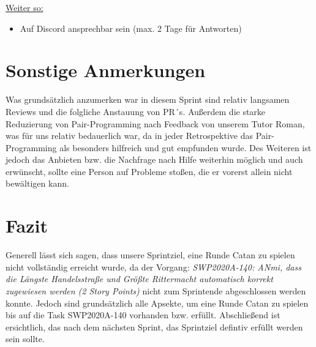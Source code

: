 \documentclass[12pt,a4paper, oneside]{article}
\begin{document}
\underline{Weiter so:}
\begin{itemize}
    \item Auf Discord ansprechbar sein (max. 2 Tage für Antworten)
\end{itemize}

\newpage
\section{Sonstige Anmerkungen}
Was grundsätzlich anzumerken war in diesem Sprint sind relativ langsamen Reviews und die folgliche Anstauung von PR´s.
Außerdem die starke Reduzierung von Pair-Programming nach Feedback von unserem Tutor Roman, was für uns relativ bedauerlich war, da in jeder Retrospektive das Pair-Programming als besonders hilfreich und gut empfunden wurde.
Des Weiteren ist jedoch das Anbieten bzw. die Nachfrage nach Hilfe weiterhin möglich und auch erwünscht, sollte eine Person auf Probleme stoßen, die er vorerst allein nicht bewältigen kann.

\section{Fazit}
Generell lässt sich sagen, dass unsere Sprintziel, eine Runde Catan zu spielen nicht vollständig erreicht wurde, da der Vorgang: \textit{SWP2020A-140: ANmi, dass die Längste Handelsstraße und Größte Rittermacht automatisch korrekt zugewiesen werden (2 Story Points)} nicht zum Sprintende abgeschlossen werden konnte.
Jedoch sind grundsätzlich alle Apsekte, um eine Runde Catan zu spielen bis auf die Task SWP2020A-140 vorhanden bzw. erfüllt. Abschließend ist ersichtlich, das nach dem nächsten Sprint, das Sprintziel defintiv erfüllt werden sein sollte.
\end{document}
